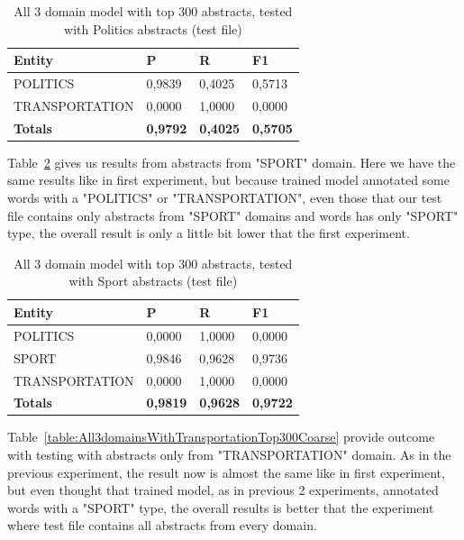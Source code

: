 \documentclass[thesis=M,english]{FITthesis}[2018/05/30]
\begin{document}
	\begin{table}[H]\centering
		\begin{tabular}{|l|l|l|l|}
			\hline {\textbf{Entity}} & {\textbf{P}} & {\textbf{R}} & {\textbf{F1}}\\\hline
				POLITICS & 0,9839 & 0,4025 & 0,5713\\
				TRANSPORTATION & 0,0000 & 1,0000 & 0,0000\\\hline
				\textbf{Totals} & \textbf{0,9792} & \textbf{0,4025} & \textbf{0,5705}\\\hline
		\end{tabular}
		\caption{All 3 domain model with top 300 abstracts, tested with Politics abstracts (test file)\label{table:All3domainsWithPoliticsTop300Coarse}}
	\end{table}	
	
	Table~\ref{table:All3domainsWithSportTop300Coarse} gives us results from abstracts from "SPORT" domain. Here we have the same results like in first experiment, but because trained model annotated some words with a "POLITICS" or "TRANSPORTATION", even those that our test file contains only abstracts from "SPORT" domains and words has only "SPORT" type, the overall result is only a little bit lower that the first experiment.

	\begin{table}[H]\centering
		\begin{tabular}{|l|l|l|l|}
			\hline {\textbf{Entity}} & {\textbf{P}} & {\textbf{R}} & {\textbf{F1}}\\\hline
				POLITICS & 0,0000 & 1,0000 & 0,0000\\
				SPORT & 0,9846 & 0,9628 & 0,9736\\
				TRANSPORTATION & 0,0000 & 1,0000 & 0,0000\\\hline
				\textbf{Totals} & \textbf{0,9819} & \textbf{0,9628} & \textbf{0,9722}\\\hline
		\end{tabular}
		\caption{All 3 domain model with top 300 abstracts, tested with Sport abstracts (test file) \label{table:All3domainsWithSportTop300Coarse}}
	\end{table}	
	
	Table~\ref{table:All3domainsWithTransportationTop300Coarse} provide outcome with testing with abstracts only from "TRANSPORTATION" domain. As in the previous experiment, the result now is almost the same like in first experiment, but even thought that trained model, as in previous 2 experiments, annotated words with a "SPORT" type, the overall results is better that the experiment where test file contains all abstracts from every domain. 
	
\end{document}
